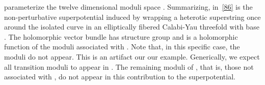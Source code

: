 \documentclass[a4paper,12pt]{article}
\numberwithin{equation}{section}
\theoremstyle{plain}
\begin{document}
parameterize the twelve dimensional moduli space \coordHE{}. Summarizing, \coordHE{} in~\eqref{86} is the
non-perturbative superpotential induced by wrapping a heterotic
superstring
once around the isolated curve \coordHE{} in an elliptically fibered
Calabi-Yau threefold with base \coordHE{}. The holomorphic vector
bundle \coordHE{} has structure group \coordHE{} and \coordHE{} is a holomorphic function
of
the moduli associated with \coordHE{}. Note that, in this specific
case, the
\coordHE{} moduli do not appear. This is an artifact
our our example. Generically, we expect all transition moduli to appear in
\coordHE{}.
The remaining moduli of \coordHE{}, that is, those not associated with
\coordHE{}, do not appear in this contribution to the
superpotential.
\end{document}
